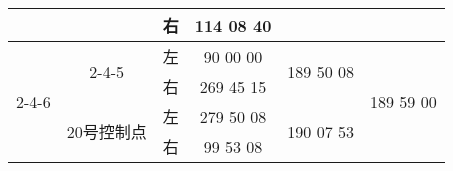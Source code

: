 \documentclass[UTF8]{ctexart}
\begin{document}
\begin{table}[h]
\begin{tabular}{|c|c|c|c|c|c|}
			&                         & 右                   & 114 08 40                                                                                                &                                                                                                         &                                                                                                         \\ \hline
			\multirow{4}{*}{2-4-6}  & \multirow{2}{*}{2-4-5}  & 左                   & 90 00 00                                                                                                 & \multirow{2}{*}{189 50 08}                                                                              & \multirow{4}{*}{189 59 00}                                                                              \\ \cline{3-4}
			&                         & 右                   & 269 45 15                                                                                                &                                                                                                         &                                                                                                         \\ \cline{2-5}
			& \multirow{2}{*}{20号控制点} & 左                   & 279 50 08                                                                                                & \multirow{2}{*}{190 07 53}                                                                              &                                                                                                         \\ \cline{3-4}
			&                         & 右                   & 99 53 08                                                                                                 &                                                                                                         &                                                                                                         \\ \hline
		\end{tabular}
	\end{table}
	\newpage
\end{document}
